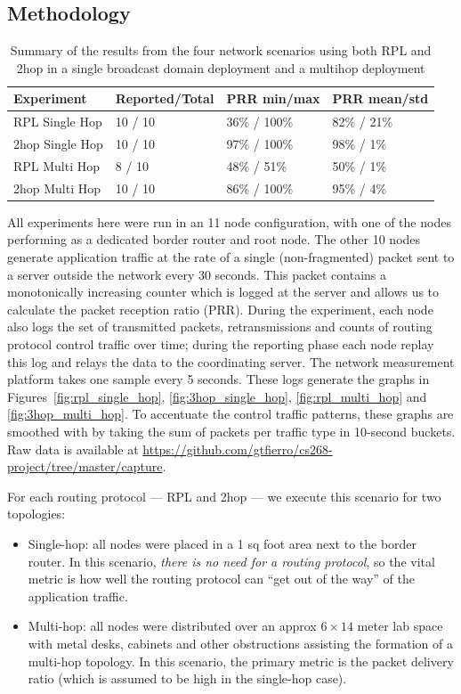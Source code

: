 \subsection{Methodology}

\begin{table}[t]
\centering
\caption{Summary of the results from the four network scenarios using both RPL and 2hop in a single broadcast domain deployment and a multihop deployment}
\label{table:results}
\begin{tabular}{|l|l|l|l|}
\hline
\textbf{Experiment} & \textbf{Reported/Total} & \textbf{PRR min/max} & \textbf{PRR mean/std} \\
\hline
\hline
RPL Single Hop & 10 / 10 & 36\% / 100\% & 82\% / 21\% \\
2hop Single Hop & 10 / 10 & 97\% / 100\% & 98\% / 1\% \\
RPL Multi Hop & 8 / 10 & 48\% / 51\% & 50\% / 1\% \\
2hop Multi Hop & 10 / 10 & 86\% / 100\% & 95\% / 4\% \\
\hline
\end{tabular}
\end{table}


All experiments here were run in an 11 node configuration, with one of the nodes performing as a dedicated border router and root node.
The other 10 nodes generate application traffic at the rate of a single (non-fragmented) packet sent to a server outside the network every 30 seconds.
This packet contains a monotonically increasing counter which is logged at the server and allows us to calculate the packet reception ratio (PRR).
During the experiment, each node also logs the set of transmitted packets, retransmissions and counts of routing protocol control traffic over time; during the reporting phase each node replay this log and relays the data to the coordinating server.
The network measurement platform takes one sample every 5 seconds.
These logs generate the graphs in Figures~\ref{fig:rpl_single_hop}, \ref{fig:3hop_single_hop}, \ref{fig:rpl_multi_hop} and \ref{fig:3hop_multi_hop}.
To accentuate the control traffic patterns, these graphs are smoothed with by taking the sum of packets per traffic type in 10-second buckets. Raw data is available at \url{https://github.com/gtfierro/cs268-project/tree/master/capture}.

For each routing protocol --- RPL and 2hop --- we execute this scenario for two topologies:
\begin{itemize}
\item Single-hop: all nodes were placed in a 1 sq foot area next to the border router.
In this scenario, \emph{there is no need for a routing protocol}, so the vital metric is how well the routing protocol can ``get out of the way'' of the application traffic.
\item Multi-hop: all nodes were distributed over an approx $6\times 14$ meter lab space with metal desks, cabinets and other obstructions assisting the formation of a multi-hop topology.
In this scenario, the primary metric is the packet delivery ratio (which is assumed to be high in the single-hop case).
\end{itemize}

